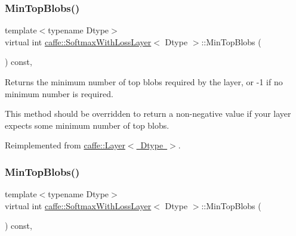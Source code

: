 \subsubsection{\texorpdfstring{Min\+Top\+Blobs()}{MinTopBlobs()}\hspace{0.1cm}{\footnotesize\ttfamily [1/2]}}
{\footnotesize\ttfamily template$<$typename Dtype$>$ \\
virtual int \mbox{\hyperlink{classcaffe_1_1_softmax_with_loss_layer}{caffe\+::\+Softmax\+With\+Loss\+Layer}}$<$ Dtype $>$\+::Min\+Top\+Blobs (\begin{DoxyParamCaption}{ }\end{DoxyParamCaption}) const\hspace{0.3cm}{\ttfamily [inline]}, {\ttfamily [virtual]}}



Returns the minimum number of top blobs required by the layer, or -\/1 if no minimum number is required. 

This method should be overridden to return a non-\/negative value if your layer expects some minimum number of top blobs. 

Reimplemented from \mbox{\hyperlink{classcaffe_1_1_layer_ab9e4c8d642e413948b131d851a8462a4}{caffe\+::\+Layer$<$ Dtype $>$}}.

\mbox{\label{classcaffe_1_1_softmax_with_loss_layer_a9969336702fb1bbf31750629fb38fb45}} 
\subsubsection{\texorpdfstring{Min\+Top\+Blobs()}{MinTopBlobs()}\hspace{0.1cm}{\footnotesize\ttfamily [2/2]}}
{\footnotesize\ttfamily template$<$typename Dtype$>$ \\
virtual int \mbox{\hyperlink{classcaffe_1_1_softmax_with_loss_layer}{caffe\+::\+Softmax\+With\+Loss\+Layer}}$<$ Dtype $>$\+::Min\+Top\+Blobs (\begin{DoxyParamCaption}{ }\end{DoxyParamCaption}) const\hspace{0.3cm}{\ttfamily [inline]}, {\ttfamily [virtual]}}



